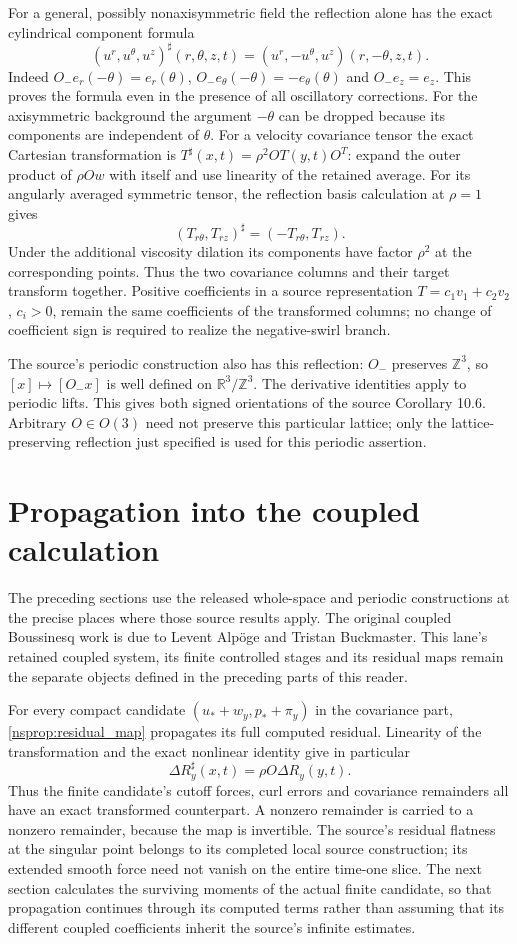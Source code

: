 \documentclass[11pt]{article}
\begin{document}
For a general, possibly nonaxisymmetric field the reflection alone has
the exact cylindrical component formula
\[
 (u^r,u^\theta,u^z)^\sharp(r,\theta,z,t)
    =(u^r,-u^\theta,u^z)(r,-\theta,z,t).
\]
Indeed $O_-e_r(-\theta)=e_r(\theta)$,
$O_-e_\theta(-\theta)=-e_\theta(\theta)$ and $O_-e_z=e_z$.
This proves the formula even in the presence of all oscillatory
corrections. For the axisymmetric background the argument $-\theta$
can be dropped because its components are independent of $\theta$.
For a velocity covariance tensor the exact Cartesian transformation is
$T^\sharp(x,t)=\rho^2 O T(y,t)O^T$: expand the outer product of
$\rho Ow$ with itself and use linearity of the retained average.
For its angularly averaged symmetric tensor, the reflection basis
calculation at $\rho=1$ gives
\[
 (T_{r\theta},T_{rz})^\sharp=(-T_{r\theta},T_{rz}).
\]
Under the additional viscosity dilation its components have factor
$\rho^2$ at the corresponding points. Thus the two covariance columns
and their target transform together. Positive coefficients in a source
representation $T=c_1v_1+c_2v_2$, $c_i>0$, remain the same coefficients
of the transformed columns; no change of coefficient sign is required
to realize the negative-swirl branch.

The source's periodic construction also has this reflection: $O_-$
preserves $\mathbb Z^3$, so $[x]\mapsto[O_-x]$ is well defined on
$\mathbb R^3/\mathbb Z^3$. The derivative identities apply to periodic
lifts. This gives both signed orientations of the source Corollary 10.6.
Arbitrary $O\in O(3)$ need not preserve this particular lattice; only
the lattice-preserving reflection just specified is used for this
periodic assertion.

\section{Propagation into the coupled calculation}
\label{nsprop:programme}
The preceding sections use the released whole-space and periodic
constructions at the precise places where those source results apply.
The original coupled Boussinesq work is due to Levent Alp\"oge and
Tristan Buckmaster. This lane's retained coupled system, its finite
controlled stages and its residual maps remain the separate objects
defined in the preceding parts of this reader.

For every compact candidate $(u_*+w_y,p_*+\pi_y)$ in the covariance
part, \eqref{nsprop:residual_map} propagates its full computed residual.
Linearity of the transformation and the exact nonlinear identity give
in particular
\[
 \Delta R_y^\sharp(x,t)=\rho O\Delta R_y(y,t).
\]
Thus the finite candidate's cutoff forces, curl errors and covariance
remainders all have an exact transformed counterpart. A nonzero
remainder is carried to a nonzero remainder, because the map is
invertible. The source's residual flatness at the singular point belongs
to its completed local source construction; its extended smooth force
need not vanish on the entire time-one slice. The next section calculates the
surviving moments of the actual finite candidate, so that propagation
continues through its computed terms rather than assuming that its
different coupled coefficients inherit the source's infinite estimates.
\end{document}
